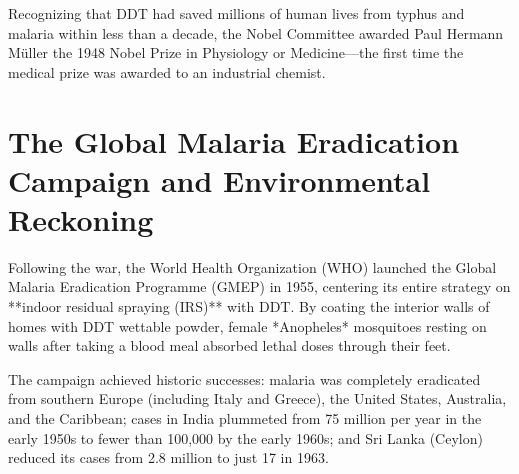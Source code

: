 Recognizing that DDT had saved millions of human lives from typhus and malaria within less than a decade, the Nobel Committee awarded Paul Hermann Müller the 1948 Nobel Prize in Physiology or Medicine—the first time the medical prize was awarded to an industrial chemist.

\section{The Global Malaria Eradication Campaign and Environmental Reckoning}

Following the war, the World Health Organization (WHO) launched the Global Malaria Eradication Programme (GMEP) in 1955, centering its entire strategy on **indoor residual spraying (IRS)** with DDT. By coating the interior walls of homes with DDT wettable powder, female *Anopheles* mosquitoes resting on walls after taking a blood meal absorbed lethal doses through their feet. 

The campaign achieved historic successes: malaria was completely eradicated from southern Europe (including Italy and Greece), the United States, Australia, and the Caribbean; cases in India plummeted from 75 million per year in the early 1950s to fewer than 100,000 by the early 1960s; and Sri Lanka (Ceylon) reduced its cases from 2.8 million to just 17 in 1963.

